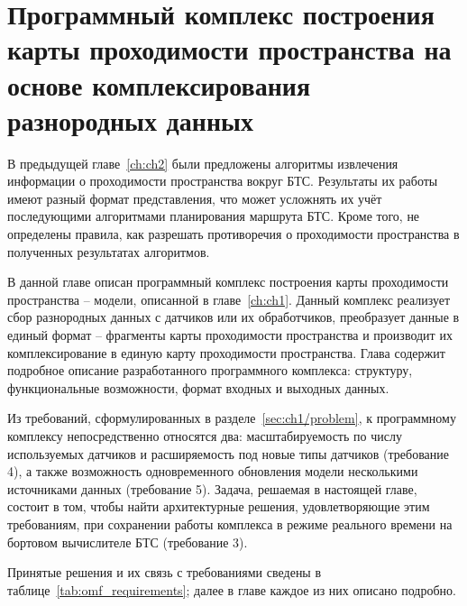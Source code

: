 \chapter{Программный комплекс построения карты проходимости пространства на основе комплексирования разнородных данных}\label{ch:ch3}

В предыдущей главе~\cref{ch:ch2} были предложены алгоритмы извлечения информации о проходимости пространства вокруг БТС. Результаты их работы имеют разный формат представления, что может усложнять их учёт последующими алгоритмами планирования маршрута БТС. Кроме того, не определены правила, как разрешать противоречия о проходимости пространства в полученных результатах алгоритмов.

В данной главе описан программный комплекс построения карты проходимости пространства -- модели, описанной в главе~\cref{ch:ch1}. Данный комплекс реализует сбор разнородных данных с датчиков или их обработчиков, преобразует данные в единый формат -- фрагменты карты проходимости пространства и производит их комплексирование в единую карту проходимости пространства. Глава содержит подробное описание разрабо­танного программного комплекса: структуру, функциональные возможности, формат входных и выходных данных.

Из требований, сформулированных в разделе~\cref{sec:ch1/problem}, к программному комплексу непосредственно относятся два: масштабируемость по числу используемых датчиков и расширяемость под новые типы датчиков (требование 4), а также возможность одновременного обновления модели несколькими источниками данных (требование 5). Задача, решаемая в настоящей главе, состоит в том, чтобы найти архитектурные решения, удовлетворяющие этим требованиям, при сохранении работы комплекса в режиме реального времени на бортовом вычислителе БТС (требование 3).

Принятые решения и их связь с требованиями сведены в таблице~\cref{tab:omf_requirements};
далее в главе каждое из них описано подробно.

